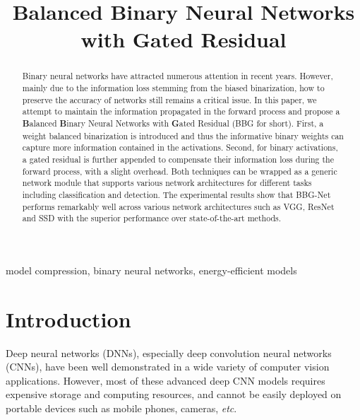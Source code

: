 \documentclass{article}
\title{Balanced Binary Neural Networks with Gated Residual}
\newcommand{\etc}{\emph{etc}}
\begin{document}
\maketitle
\begin{abstract}
	Binary neural networks have attracted numerous attention in recent years. However, mainly due to the information loss stemming from the biased binarization, how to preserve the accuracy of networks still remains a critical issue. In this paper, we attempt to maintain the information propagated in the forward process and propose a \textbf{B}alanced \textbf{B}inary Neural Networks with \textbf{G}ated Residual (BBG for short). First, a weight balanced binarization is introduced and thus the informative binary weights can capture more information contained in the activations. Second, for binary activations, a gated residual is further appended to compensate their information loss during the forward process, with a slight overhead. Both techniques can be wrapped as a generic network module that supports various network architectures for different tasks including classification and detection. The experimental results show that BBG-Net performs remarkably well across various network architectures such as VGG, ResNet and SSD with the superior performance over state-of-the-art methods.
\end{abstract}
\begin{keywords}
	model compression, binary neural networks, energy-efficient models
\end{keywords}
\section{Introduction}
Deep neural networks (DNNs), especially deep convolution neural networks (CNNs), have been well demonstrated in a wide variety of computer vision applications. However, most of these advanced deep CNN models requires expensive storage and computing resources, and cannot be easily deployed on portable devices such as mobile phones, cameras, \etc.
\end{document}
